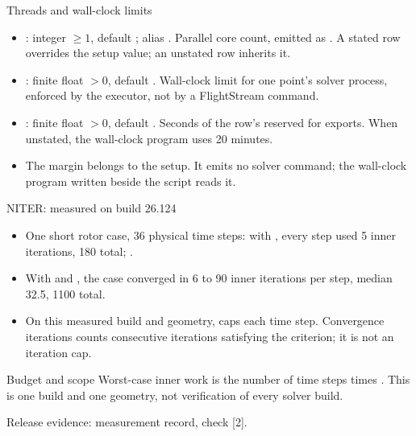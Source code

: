 \begin{frame}{Threads and wall-clock limits}
\begin{itemize}\small
  \item {}: integer $\geq 1$, default ; alias
        . Parallel core count, emitted as
        . A stated row 
        overrides the setup value; an unstated row inherits it.
  \item {}: finite float $>0$, default .
        Wall-clock limit for one point's solver process, enforced by the
        executor, not by a FlightStream command.
  \item {}: finite float $>0$, default .
        Seconds of the row's  reserved for exports.
        When unstated, the wall-clock program uses 20 minutes.
  \item The margin belongs to the setup. It emits no solver command;
        the wall-clock program written beside the script reads it.
\end{itemize}
\end{frame}

\begin{frame}{NITER: measured on build 26.124}
\begin{itemize}\small
  \item One short rotor case, 36 physical time steps: with ,
        every step used 5 inner iterations, 180 total; .
  \item With  and ,
        the case converged in 6 to 90 inner iterations per step,
        median 32.5, 1100 total.
  \item On this measured build and geometry,  caps each time step.
        Convergence iterations counts consecutive iterations satisfying the
        criterion; it is not an iteration cap.
\end{itemize}
\begin{block}{Budget and scope}
Worst-case inner work is the number of time steps times .
This is one build and one geometry, not verification of every solver build.
\end{block}
{\tiny Release evidence: measurement record, check  [2].\par}
\end{frame}
